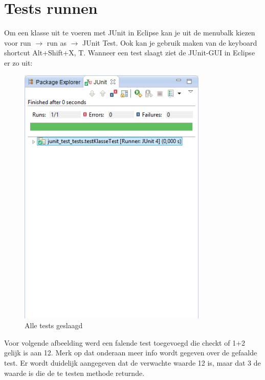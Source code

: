 \documentclass{book}
\begin{document}
\chapter{Tests runnen}

Om een klasse uit te voeren met JUnit in Eclipse kan je uit de menubalk kiezen voor run $\rightarrow$ run as $\rightarrow$ JUnit Test. Ook kan je gebruik maken van de keyboard shortcut Alt+Shift+X, T. Wanneer een test slaagt ziet de JUnit-GUI in Eclipse er zo uit:

\begin{figure}[ht!]
\centering
\includegraphics[width=90mm]{testsuccess.png}
\caption{Alle tests geslaagd}
\end{figure}

Voor volgende afbeelding werd een falende test toegevoegd die checkt of 1+2 gelijk is aan 12. Merk op dat onderaan meer info wordt gegeven over de gefaalde test. Er wordt duidelijk aangegeven dat de verwachte waarde 12 is, maar dat 3 de waarde is die de te testen methode returnde.
\end{document}
